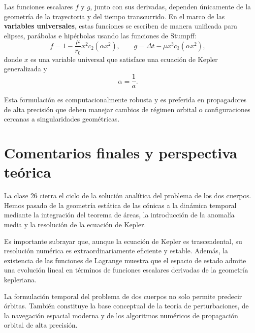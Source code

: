 Las funciones escalares \(f\) y \(g\), junto con sus derivadas, dependen únicamente de la geometría de la trayectoria y del tiempo transcurrido. En el marco de las \textbf{variables universales}, estas funciones se escriben de manera unificada para elipses, parábolas e hipérbolas usando las funciones de Stumpff:
\[
 f = 1 - \frac{\mu}{r_0}x^2 c_2(\alpha x^2),
 \qquad
 g = \Delta t - \mu x^3 c_3(\alpha x^2),
\]
donde \(x\) es una variable universal que satisface una ecuación de Kepler generalizada y
\[
 \alpha = \frac{1}{a}.
\]

Esta formulación es computacionalmente robusta y es preferida en propagadores de alta precisión que deben manejar cambios de régimen orbital o configuraciones cercanas a singularidades geométricas.

\section{Comentarios finales y perspectiva teórica}
La clase 26 cierra el ciclo de la solución analítica del problema de los dos cuerpos. Hemos pasado de la geometría estática de las cónicas a la dinámica temporal mediante la integración del teorema de áreas, la introducción de la anomalía media y la resolución de la ecuación de Kepler.

Es importante subrayar que, aunque la ecuación de Kepler es trascendental, su resolución numérica es extraordinariamente eficiente y estable. Además, la existencia de las funciones de Lagrange muestra que el espacio de estado admite una evolución lineal en términos de funciones escalares derivadas de la geometría kepleriana.

\begin{importante}
La formulación temporal del problema de dos cuerpos no solo permite predecir órbitas. También constituye la base conceptual de la teoría de perturbaciones, de la navegación espacial moderna y de los algoritmos numéricos de propagación orbital de alta precisión.
\end{importante}